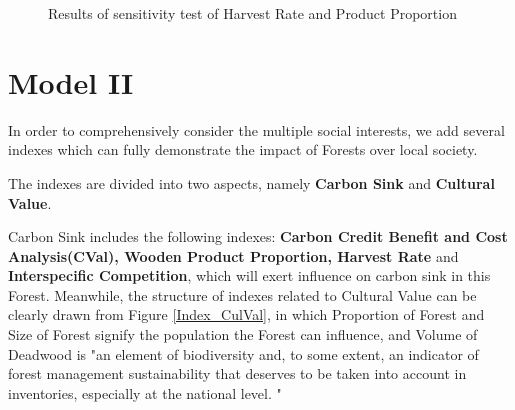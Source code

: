 \documentclass{mcmthesis}
\numberwithin{figure}{section}
\numberwithin{table}{section}
\numberwithin{equation}{section}
\begin{document}
\begin{figure}[htbp]
  \centering

\caption{Results of sensitivity test of Harvest Rate and Product Proportion}
\end{figure}






\newpage




\section{Model II}

In order to comprehensively consider the multiple social interests, we add
several indexes which can fully demonstrate the impact of Forests over local 
society. 
\par
The indexes are divided into two aspects, namely \textbf{Carbon Sink} and \textbf{Cultural Value}.
\par
Carbon Sink includes the following indexes: \textbf{Carbon Credit Benefit and 
Cost Analysis(CVal), Wooden Product Proportion, Harvest Rate} and \textbf{Interspecific 
Competition}, which will exert influence on carbon sink in this Forest.
Meanwhile, the structure of indexes related to Cultural Value can be clearly drawn
from Figure \ref{Index_CulVal}, in which Proportion of Forest and Size
of Forest signify the population the Forest can influence, and Volume of Deadwood
is "an element of biodiversity and, to some extent, an indicator of forest 
management sustainability that deserves to be taken into account in inventories,
especially at the national level. "\citep{rondeux2010review}
\end{document}
